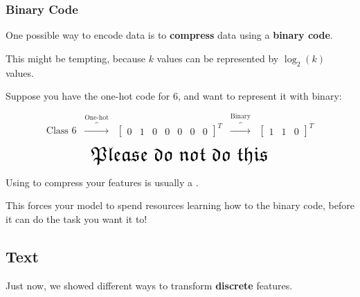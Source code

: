             \subsubsection{Binary Code}

                One possible way to encode data is to \textbf{compress} data using a \textbf{binary code}.

                This might be tempting, because $k$ values can be represented by $\log_2(k)$ values.

                \miniex Suppose you have the one-hot code for $6$, and want to represent it with binary:

                \begin{equation}
                    \text{Class 6} 
                    \;\;\overbrace{\longrightarrow}^{\text{One-hot}}\;\;
                    \begin{bmatrix}
                        0 & 1 & 0 & 0 & 0 & 0 & 0
                    \end{bmatrix}^T
                    \;\;\overbrace{\longrightarrow}^{\text{Binary}}\;\;
                    \begin{bmatrix}
                        1 & 1 & 0
                    \end{bmatrix}^T
                \end{equation}

                \begin{equation*}
                    \mathlarger{\mathlarger{\mathlarger{\mathlarger{
                        \mathfrak{Please\;do\;not\;do\;this}
                    }}}}
                \end{equation*}

                \begin{concept}
                    Using  to compress your features is usually a .

                    This forces your model to spend resources learning how to  the binary code, before it can do the task you want it to!
                \end{concept}

            \subsecdiv

        \subsection{Text}

            Just now, we showed different ways to transform \textbf{discrete} features.

